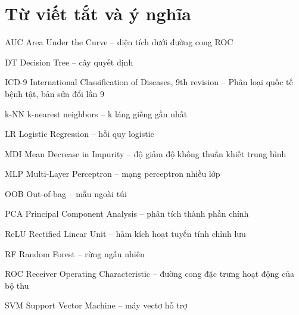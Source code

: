\documentclass[a4paper]{report}
\begin{document}
\taobiatruoc%

\phantruoc
\tableofcontents
\chapter*{Từ viết tắt và ý nghĩa}
\begin{tuviettat}
  \item[AUC] Area Under the Curve – diện tích dưới đường cong ROC
  \item[DT] Decision Tree – cây quyết định
  \item[ICD-9] International Classification of Diseases, 9th revision – Phân loại quốc tế bệnh tật, bản sửa đổi lần 9
  \item[k-NN] k-nearest neighbors – k láng giềng gần nhất
  \item[LR] Logistic Regression – hồi quy logistic
  \item[MDI] Mean Decrease in Impurity – độ giảm độ không thuần khiết trung bình
  \item[MLP] Multi-Layer Perceptron – mạng perceptron nhiều lớp
  \item[OOB] Out-of-bag – mẫu ngoài túi
  \item[PCA] Principal Component Analysis – phân tích thành phần chính
  \item[ReLU] Rectified Linear Unit – hàm kích hoạt tuyến tính chỉnh lưu
  \item[RF] Random Forest – rừng ngẫu nhiên
  \item[ROC] Receiver Operating Characteristic – đường cong đặc trưng hoạt động của bộ thu
  \item[SVM] Support Vector Machine – máy vectơ hỗ trợ
\end{tuviettat}
\end{document}
